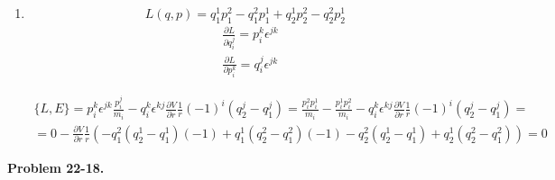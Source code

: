 \documentclass[11pt]{amsart}
\theoremstyle{definition}
\newcommand{\problemhead}[1]{\medskip\noindent\textbf{Problem #1.} }
\begin{document}
\begin{enumerate}
\[
\lbrace P,E \rbrace =0 - u^j \frac{ \partial V}{ \partial r} \frac{1}{r} (-1)^i(q_2^j-q_1^j) = -\mathbf{u}\cdot(\mathbf{q}_2-\mathbf{q}_1) \frac{ \partial V}{ \partial r} \frac{1}{r}(-1) + -\mathbf{u}\cdot (\mathbf{q}_2-\mathbf{q}_1) \frac{ \partial V}{ \partial r} \frac{1}{r} = 0
\]

\item[(b)]
\[
L(q,p) = q_1^1 p_1^2 - q_1^2 p_1^1 + q_2^1p_2^2 - q_2^2 p_2^1
\]
\[
\begin{aligned}
  & \frac{ \partial L}{ \partial q_i^j } = p_i^k \epsilon^{jk} \\
  & \frac{ \partial L}{ \partial p_i^k } = q_i^j \epsilon^{jk}
\end{aligned}
\]


\[
\begin{gathered}
  \lbrace L, E \rbrace = p_i^k \epsilon^{jk} \frac{p_i^j}{m_i} - q_i^k \epsilon^{kj} \frac{ \partial V}{ \partial r} \frac{1}{r} (-1)^i (q_2^j - q_1^j) = \frac{ p_i^2 p_i^1}{m_i} - \frac{ p_i^1 p_i^2}{m_i} -  q_i^k \epsilon^{kj} \frac{ \partial V}{ \partial r} \frac{1}{r} (-1)^i (q^j_2 - q^j_1) = \\
  = 0 - \frac{ \partial V}{ \partial r} \frac{1}{r} ( -q_1^2(q_2^1- q_1^1 )(-1) + q_1^1 (q_2^2 - q_1^2)(-1) - q_2^2 (q_2^1 - q_1^1) + q_2^1 (q_2^2 - q_1^2) ) = 0
\end{gathered}
\]



\end{enumerate}


\problemhead{22-18}
\end{document}
